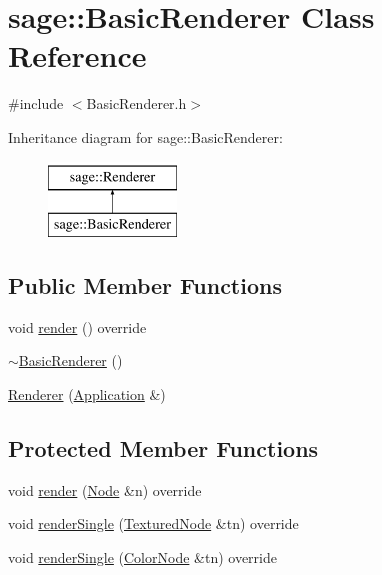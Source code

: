 \hypertarget{classsage_1_1BasicRenderer}{}\section{sage\+::Basic\+Renderer Class Reference}
\label{classsage_1_1BasicRenderer}


{\ttfamily \#include $<$Basic\+Renderer.\+h$>$}

Inheritance diagram for sage\+::Basic\+Renderer\+:\begin{figure}[H]
\begin{center}
\leavevmode
\includegraphics[height=2.000000cm]{classsage_1_1BasicRenderer}
\end{center}
\end{figure}
\subsection*{Public Member Functions}
\begin{DoxyCompactItemize}
\item 
void \mbox{\hyperlink{classsage_1_1BasicRenderer_a127bbe33d8ef13fc64ff2e3943c0636b}{render}} () override
\item 
\mbox{\hyperlink{classsage_1_1BasicRenderer_a9808c8f288a5ab275076223370c4aa00}{$\sim$\+Basic\+Renderer}} ()
\item 
\mbox{\hyperlink{classsage_1_1BasicRenderer_aea1ceb080017504798f28cde4d45502e}{Renderer}} (\mbox{\hyperlink{classsage_1_1Application}{Application}} \&)
\end{DoxyCompactItemize}
\subsection*{Protected Member Functions}
\begin{DoxyCompactItemize}
\item 
void \mbox{\hyperlink{classsage_1_1BasicRenderer_a098449e7b2b967968baaec113b53d653}{render}} (\mbox{\hyperlink{classsage_1_1Node}{Node}} \&n) override
\item 
void \mbox{\hyperlink{classsage_1_1BasicRenderer_a405afdd4975fb1e8c37d6b3396f3ea18}{render\+Single}} (\mbox{\hyperlink{classsage_1_1TexturedNode}{Textured\+Node}} \&tn) override
\item 
void \mbox{\hyperlink{classsage_1_1BasicRenderer_a970280d2d704dea463ba0adbca84835f}{render\+Single}} (\mbox{\hyperlink{classsage_1_1ColorNode}{Color\+Node}} \&tn) override
\end{DoxyCompactItemize}
